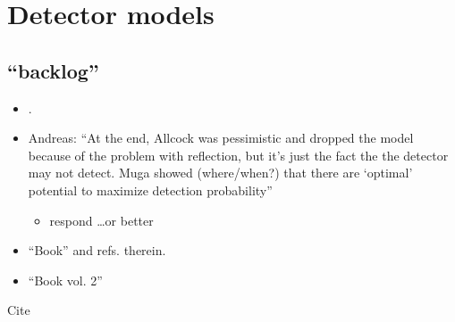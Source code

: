 \section{Detector models}

\subsection{``backlog''}

\begin{itemize}
  \item \cite[sec. 2-4]{Allcock-2}.

  \item Andreas: ``At the end, Allcock was pessimistic and dropped the model because of the problem with reflection,
but it's just the fact the the detector may not detect. Muga showed (where/when?)
that there are `optimal' potential to maximize detection probability''
  \begin{itemize}
    \item \cite[3, 6]{Leavens_TOA} respond \dots or better \cite{Leavens_backflow}
  \end{itemize}

  \item ``Book'' \cite[Sec. 1.4.3]{TQM1} and refs. therein.

  \item ``Book vol. 2'' \cite[Ch. 4]{TQM2}
\end{itemize}

Cite \cite{
  Allcock-1, Allcock-2, Allcock-3,
  Muga_ArrTimeOpNormal, Damborenea,
  Sudarshan_Zeno,
  Echanobe,
  Savvidou-1, Savvidou-2,
  ComplexAbsPot,
}
